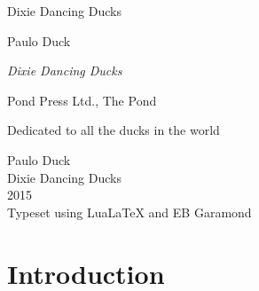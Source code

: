 \documentclass{scrbook}
\begin{document}
\begin{titlepage}
	\setlength{\parindent}{0pt}
	\centering  Dixie Dancing Ducks\par
\end{titlepage}
\begin{titlepage}
	\centering
	\vspace*{.15\textheight}
	{\Large{} Paulo Duck\par}
	\vspace*{.15\textheight}
	{\itshape\Huge Dixie Dancing Ducks\par}
	\vfill
	\par
	Pond Press Ltd., The Pond
	\vspace{.05\textheight}
\end{titlepage}
	Dedicated to all the ducks in the world\par
	\vfill
	\thispagestyle{empty}
	\begin{flushleft}
		Paulo Duck\\
		Dixie Dancing Ducks\\
		2015\\
		Typeset using LuaLaTeX and EB Garamond\\
	\end{flushleft}
\tableofcontents
\chapter{Introduction}
\end{document}
